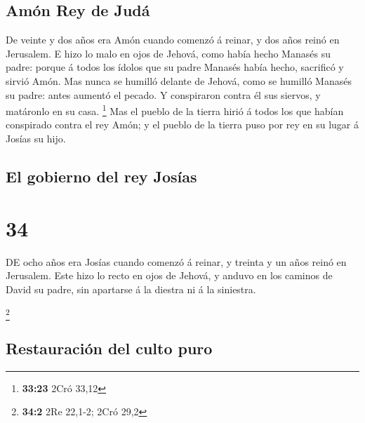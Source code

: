 \hypertarget{amuxf3n-rey-de-juduxe1}{%
\subsection{Amón Rey de Judá}\label{amuxf3n-rey-de-juduxe1}}

 De veinte y dos años era Amón cuando comenzó á reinar, y
dos años reinó en Jerusalem.  E hizo lo malo en ojos de
Jehová, como había hecho Manasés su padre: porque á todos los ídolos que
su padre Manasés había hecho, sacrificó y sirvió Amón. 
Mas nunca se humilló delante de Jehová, como se humilló Manasés su
padre: antes aumentó el pecado.  Y conspiraron contra él
sus siervos, y matáronlo en su casa. \footnote{\textbf{33:23} 2Cró 33,12}
 Mas el pueblo de la tierra hirió á todos los que habían
conspirado contra el rey Amón; y el pueblo de la tierra puso por rey en
su lugar á Josías su hijo. 

\hypertarget{el-gobierno-del-rey-josuxedas}{%
\subsection{El gobierno del rey
Josías}\label{el-gobierno-del-rey-josuxedas}}

\hypertarget{section-33}{%
\section{34}\label{section-33}}

 DE ocho años era Josías cuando comenzó á reinar, y
treinta y un años reinó en Jerusalem.  Este hizo lo recto
en ojos de Jehová, y anduvo en los caminos de David su padre, sin
apartarse á la diestra ni á la siniestra.

\footnote{\textbf{34:2} 2Re 22,1-2; 2Cró 29,2}

\hypertarget{restauraciuxf3n-del-culto-puro}{%
\subsection{Restauración del culto
puro}\label{restauraciuxf3n-del-culto-puro}}

